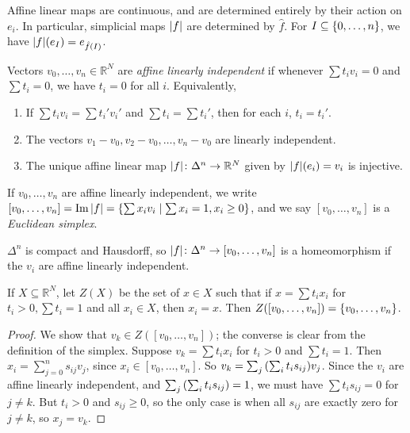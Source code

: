 \begin{remark}
	Affine linear maps are continuous, and are determined entirely by their action on \( e_i \).
	In particular, simplicial maps \( \abs{f} \) are determined by \( \hat f \).
	For \( I \subseteq \qty{0, \dots, n} \), we have \( \abs{f}(e_I) = e_{\hat f(I)} \).
\end{remark}
\begin{definition}
	Vectors \( v_0, \dots, v_n \in \mathbb R^N \) are \emph{affine linearly independent} if whenever \( \sum t_i v_i = 0 \) and \( \sum t_i = 0 \), we have \( t_i = 0 \) for all \( i \).
	Equivalently,
	\begin{enumerate}
		\item If \( \sum t_i v_i = \sum t_i' v_i' \) and \( \sum t_i = \sum t_i' \), then for each \( i \), \( t_i = t_i' \).
		\item The vectors \( v_1 - v_0, v_2 - v_0, \dots, v_n - v_0 \) are linearly independent.
		\item The unique affine linear map \( \abs{f} \colon \Delta^n \to \mathbb R^N \) given by \( \abs{f}(e_i) = v_i \) is injective.
	\end{enumerate}
	If \( v_0, \dots, v_n \) are affine linearly independent, we write \( [v_0, \dots, v_n] = \Im \abs{f} = \qty{\sum x_i v_i \mid \sum x_i = 1, x_i \geq 0} \), and we say \( [v_0, \dots, v_n] \) is a \emph{Euclidean simplex}.
\end{definition}
\begin{remark}
	\( \Delta^n \) is compact and Hausdorff, so \( \abs{f} \colon \Delta^n \to [v_0, \dots, v_n] \) is a homeomorphism if the \( v_i \) are affine linearly independent.
\end{remark}
\begin{lemma}
	If \( X \subseteq \mathbb R^N \), let \( Z(X) \) be the set of \( x \in X \) such that if \( x = \sum t_i x_i \) for \( t_i > 0, \sum t_i = 1 \) and all \( x_i \in X \), then \( x_i = x \).
	Then \( Z([v_0, \dots, v_n]) = \qty{v_0, \dots, v_n} \).
\end{lemma}
\begin{proof}
	We show that \( v_k \in Z([v_0, \dots, v_n]) \); the converse is clear from the definition of the simplex.
	Suppose \( v_k = \sum t_i x_i \) for \( t_i > 0 \) and \( \sum t_i = 1 \).
	Then \( x_i = \sum_{j=0}^n s_{ij} v_j \), since \( x_i \in [v_0, \dots, v_n] \).
	So \( v_k = \sum_j \qty(\sum_i t_i s_{ij}) v_j \).
	Since the \( v_i \) are affine linearly independent, and \( \sum_j \qty(\sum_i t_i s_{ij}) = 1 \), we must have \( \sum t_i s_{ij} = 0 \) for \( j \neq k \).
	But \( t_i > 0 \) and \( s_{ij} \geq 0 \), so the only case is when all \( s_{ij} \) are exactly zero for \( j \neq k \), so \( x_j = v_k \).
\end{proof}
